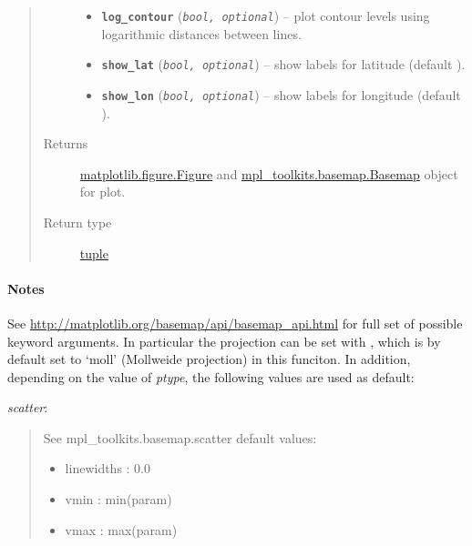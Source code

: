 \documentclass[letterpaper,10pt,english]{sphinxhowto}
\begin{document}
\begin{fulllineitems}
\begin{quote}
\begin{description}
\begin{itemize}
\item {} 
\textbf{\texttt{log\_contour}} (\emph{\texttt{bool, optional}}) -- plot contour levels using logarithmic distances between lines.

\item {} 
\textbf{\texttt{show\_lat}} (\emph{\texttt{bool, optional}}) -- show labels for latitude (default ).

\item {} 
\textbf{\texttt{show\_lon}} (\emph{\texttt{bool, optional}}) -- show labels for longitude (default ).

\end{itemize}

\item[{Returns}] \leavevmode
\href{http://matplotlib.org/api/figure\_api.html\#matplotlib.figure.Figure}{matplotlib.figure.Figure} and \href{http://matplotlib.org/basemap/api/basemap\_api.html\#mpl\_toolkits.basemap.Basemap}{mpl\_toolkits.basemap.Basemap}
object for plot.

\item[{Return type}] \leavevmode
\href{https://docs.python.org/library/functions.html\#tuple}{tuple}

\end{description}\end{quote}
\paragraph{Notes}

See \href{http://matplotlib.org/basemap/api/basemap\_api.html}{http://matplotlib.org/basemap/api/basemap\_api.html} for full set
of possible keyword arguments. In particular the projection can be
set with , which is by default set to `moll'
(Mollweide projection) in this funciton. In addition, depending on
the value of \emph{ptype}, the following values are used as default:

\emph{scatter}:
\begin{quote}

See mpl\_toolkits.basemap.scatter
default values:
\begin{itemize}
\item {} 
linewidths : 0.0

\item {} 
vmin : min(param)

\item {} 
vmax : max(param)

\end{itemize}
\end{quote}


\end{fulllineitems}
\end{document}
